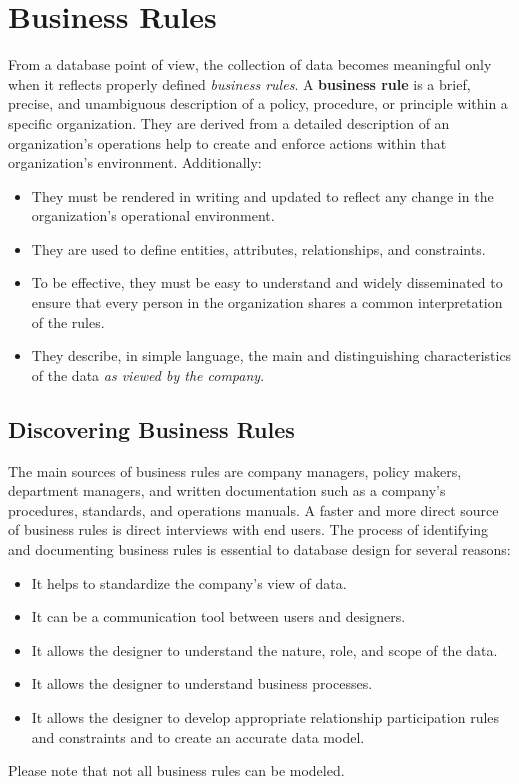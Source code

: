 \documentclass[a4paper, 12pt, titlepage]{report}
\begin{document}
\section{Business Rules}
From a database point of view, the collection of data becomes meaningful only when it reflects properly defined \emph{business rules}. A \textbf{business rule} is a brief, precise, and unambiguous description of a policy, procedure, or principle within a specific organization. They are derived from a detailed description of an organization’s operations help to create and enforce actions within that organization’s environment. Additionally:
\begin{itemize}
\item They must be rendered in writing and updated to reflect any change in the organization’s operational environment.
\item They are used to define entities, attributes, relationships, and constraints. 
\item To be effective, they must be easy to understand and widely disseminated to ensure that every person in the organization shares a common interpretation of the rules.
\item They describe, in simple language, the main and distinguishing characteristics of the data \emph{as viewed by the company}.
\end{itemize}

\subsection{Discovering Business Rules}
The main sources of business rules are company managers, policy makers, department managers, and written documentation such as a company’s procedures, standards, and operations manuals. A faster and more direct source of business rules is direct interviews with end users.
The process of identifying and documenting business rules is essential to database design for several reasons:
\begin{itemize}
\item It helps to standardize the company’s view of data.
\item It can be a communication tool between users and designers.
\item It allows the designer to understand the nature, role, and scope of the data.
\item It allows the designer to understand business processes.
\item It allows the designer to develop appropriate relationship participation rules and constraints and to create an accurate data model.
\end{itemize}
Please note that not all business rules can be modeled.
\end{document}
